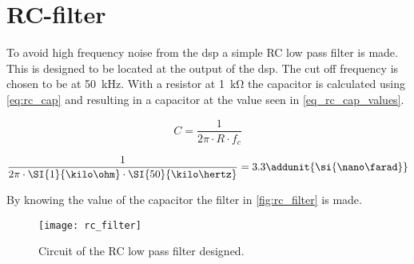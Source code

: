 \section{RC-filter}
To avoid high frequency noise from the \gls{dsp} a simple RC low pass filter is made. This is designed to be located at the output of the \gls{dsp}. The cut off frequency is chosen to be at \SI{50}{\kilo\hertz}. With a resistor at \SI{1}{\kilo\ohm} the capacitor is calculated using \autoref{eq:rc_cap} and resulting in a capacitor at the value seen in \autoref{eq_rc_cap_values}.

\begin{equation}\label{eq:rc_cap}
	C=\frac{1}{2\pi\cdot R \cdot f_c}
\end{equation}

\begin{equation}\label{eq_rc_cap_values}
	\frac{1}{2\pi\cdot \SI{1}{\kilo\ohm} \cdot \SI{50}{\kilo\hertz}} = 3.3 \addunit{\si{\nano\farad}}
\end{equation}

By knowing the value of the capacitor the filter in \autoref{fig:rc_filter} is made.
\begin{figure}[htbp]
	\centering
	\texttt{[image: rc\_filter]}
	\caption{Circuit of the RC low pass filter designed.}
	\label{fig:rc_filter}
\end{figure}
